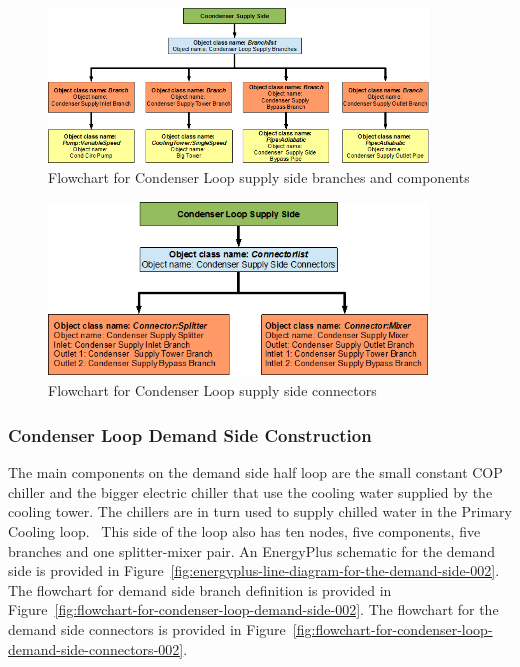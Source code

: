\begin{figure}[hbtp] %
\centering
\includegraphics[width=0.9\textwidth, height=0.9\textheight, keepaspectratio=true]{media/image120.png}
\caption{Flowchart for Condenser Loop supply side branches and components \protect \label{fig:flowchart-for-condenser-loop-supply-side-002}}
\end{figure}

\begin{figure}[hbtp] %
\centering
\includegraphics[width=0.9\textwidth, height=0.9\textheight, keepaspectratio=true]{media/image121.png}
\caption{Flowchart for Condenser Loop supply side connectors \protect \label{fig:flowchart-for-condenser-loop-supply-side-connectors-002}}
\end{figure}

\subsubsection{Condenser Loop Demand Side Construction}\label{condenser-loop-demand-side-construction-000}

The main components on the demand side half loop are the small constant COP chiller and the bigger electric chiller that use the cooling water supplied by the cooling tower. The chillers are in turn used to supply chilled water in the Primary Cooling loop. ~This side of the loop also has ten nodes, five components, five branches and one splitter-mixer pair. An EnergyPlus schematic for the demand side is provided in Figure~\ref{fig:energyplus-line-diagram-for-the-demand-side-002}. The flowchart for demand side branch definition is provided in Figure~\ref{fig:flowchart-for-condenser-loop-demand-side-002}. The flowchart for the demand side connectors is provided in Figure~\ref{fig:flowchart-for-condenser-loop-demand-side-connectors-002}.

